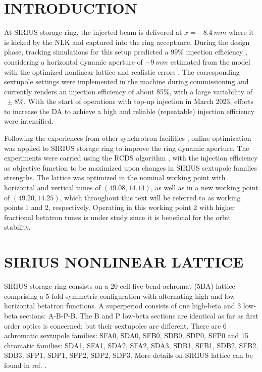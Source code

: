 \documentclass[a4paper,
               keeplastbox,   %
               ]{jacow}
\begin{document}
\section{INTRODUCTION}
At SIRIUS storage ring, the injected beam is delivered at $x=-8.4~\unit{mm}$ where it is kicked by the NLK and captured into the ring acceptance. During the design phase, tracking simulations for this setup predicted a 99\% injection efficiency \cite{Liu:IPAC2016-THPMR011}, considering a horizontal dynamic aperture of $-9~\unit{mm}$  estimated from the model with the optimized nonlinear lattice and realistic errors \cite{deSá:IPAC2016-THPMR012}.  The corresponding sextupole settings were implemented in the machine during commissioning and currently renders an injection efficiency of about 85\%, with a large variability of $~\pm8\%$. With the start of operations with top-up injection in March 2023, efforts to increase the DA to achieve a high and reliable (repeatable) injection efficiency were intensified. 

Following the experiences from other synchrotron facilities \cite{Huang:2015, Liuzzo:IPAC2016-THPMR015, Olsson:IPAC2018-WEPAL047, yang:ipac2022-tupopt064}, online optimization was applied to SIRIUS storage ring to improve the ring dynamic aperture. The experiments were carried using the RCDS algorithm \cite{Huang:2013}, with the injection efficiency as objective function to be maximized upon changes in SIRIUS sextupole families strengths. The lattice was optimized in the nominal working point with horizontal and vertical tunes of $(49.08, 14.14)$, as well as in a new working point of $(49.20, 14.25)$, which throughout this text will be referred to as working points 1 and 2, respectively. Operating in this working point 2 with higher fractional betatron tunes is under study since it is beneficial for the orbit stability.

\section{SIRIUS NONLINEAR LATTICE}
 SIRIUS storage ring consists on a 20-cell five-bend-achromat (5BA) lattice 
 comprising a 5-fold symmetric configuration with alternating high and low horizontal betatron functions. A superperiod consists of one high-beta and 3 low-beta sections: A-B-P-B. The B and P low-beta sections are identical as far as first order optics is concerned; but their sextupoles are different. There are 6 achromatic sextupole families: SFA0, SDA0, SFB0, SDB0, SDP0, SFP0 and 15 chromatic families: SDA1, SFA1, SDA2, SFA2, SDA3, SDB1, SFB1, SDB2, SFB2, SDB3, SFP1, SDP1, SFP2, SDP2, SDP3. More details on SIRIUS lattice can be found in ref. \cite{Liu:IPAC2016-THPMR013}.
\end{document}
